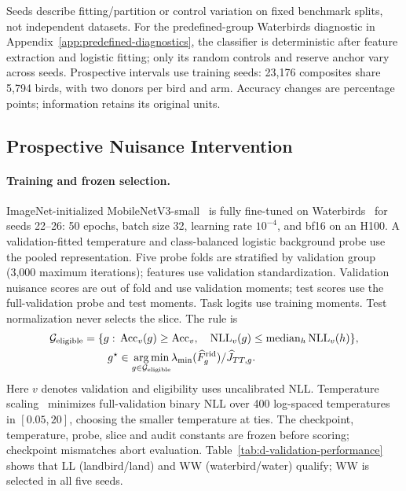 Seeds describe fitting/partition or control variation on fixed benchmark splits, not independent datasets. For the predefined-group Waterbirds diagnostic in Appendix~\ref{app:predefined-diagnostics}, the classifier is deterministic after feature extraction and logistic fitting; only its random controls and reserve anchor vary across seeds. Prospective intervals use training seeds: 23,176 composites share 5,794 birds, with two donors per bird and arm. Accuracy changes are percentage points; information retains its original units.

\subsection{Prospective Nuisance Intervention}
\label{app:prospective-intervention}

\paragraph{Training and frozen selection.}
ImageNet-initialized MobileNetV3-small~\citep{russakovsky2015imagenet,howard2019searching} is fully fine-tuned on Waterbirds~\citep{sagawa2019distributionally} for seeds 22--26: 50 epochs, batch size 32, learning rate $10^{-4}$, and bf16 on an H100. A validation-fitted temperature and class-balanced logistic background probe use the pooled representation. Five probe folds are stratified by validation group (3,000 maximum iterations); features use validation standardization. Validation nuisance scores are out of fold and use validation moments; test scores use the full-validation probe and test moments. Task logits use training moments. Test normalization never selects the slice. The rule is
\begin{equation}
\begin{aligned}
\mathcal G_{\mathrm{eligible}}=\{g:\;&\operatorname{Acc}_{v}(g)\ge\operatorname{Acc}_{v},\quad
\operatorname{NLL}_{v}(g)\le\operatorname{median}_{h}\operatorname{NLL}_{v}(h)\},\\
g^\star&\in\underset{g\in\mathcal G_{\mathrm{eligible}}}{\arg\min}
\lambda_{\min}(\widehat F_g^{\mathrm{rid}})/\widehat J_{TT,g}.
\end{aligned}
\label{eq:d-prospective-selection}
\end{equation}
Here $v$ denotes validation and eligibility uses uncalibrated NLL. Temperature scaling~\citep{guo2017calibration} minimizes full-validation binary NLL over 400 log-spaced temperatures in $[0.05,20]$, choosing the smaller temperature at ties. The checkpoint, temperature, probe, slice and audit constants are frozen before scoring; checkpoint mismatches abort evaluation. Table~\ref{tab:d-validation-performance} shows that LL (landbird/land) and WW (waterbird/water) qualify; WW is selected in all five seeds.

